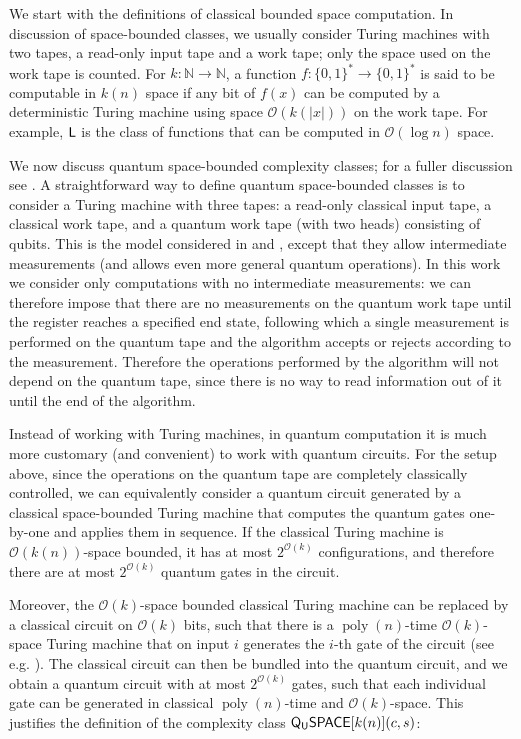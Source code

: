 \documentclass[11pt]{article}
\theoremstyle{definition}
\theoremstyle{remark}
\newcommand\QSPACE{{\sf{Q_{U}SPACE}}}
\newcommand\Logspace{{\sf{L}}}
\newcommand\bigoh{\mathcal{O}}
\DeclareMathOperator{\poly}{poly}
\begin{document}
We start with the definitions of classical bounded space computation. In discussion of space-bounded classes, we usually consider Turing machines with two tapes, a read-only input tape and a work tape; only the space used on the work tape is counted. For $k:\mathbb{N}\rightarrow\mathbb{N}$, a function $f:\{0,1\}^{*}\rightarrow\{0,1\}^*$ is said to be computable in $k(n)$ space if any bit of $f(x)$ can be computed by a deterministic Turing machine using space $\bigoh(k(|x|))$ on the work tape.  For example, $\Logspace$ is the class of functions that can be computed in $\bigoh(\log{n})$ space.

We now discuss quantum space-bounded complexity classes; for a fuller discussion see \cite{Watrous09}. A straightforward way to define quantum space-bounded classes is to consider a Turing machine with three tapes: a read-only classical input tape, a classical work tape, and a quantum work tape (with two heads) consisting of qubits. This is the model considered in \cite{tashma} and \cite{Watrous03}, except that they allow intermediate measurements (and \cite{Watrous03} allows even more general quantum operations). In this work we consider only computations with no intermediate measurements: we can therefore impose that there are no measurements on the quantum work tape until the register reaches a specified end state, following which a single measurement is performed on the quantum tape and the algorithm accepts or rejects according to the measurement. Therefore the operations performed by the algorithm will not depend on the quantum tape, since there is no way to read information out of it until the end of the algorithm.

Instead of working with Turing machines, in quantum computation it is much more customary (and convenient) to work with quantum circuits. For the setup above, since the operations on the quantum tape are completely classically controlled, we can equivalently consider a quantum circuit generated by a classical space-bounded Turing machine that computes the quantum gates one-by-one and applies them in sequence. If the classical Turing machine is $\mathcal{O}(k(n))$-space bounded, it has at most $2^{\mathcal{O}(k)}$ configurations, and therefore there are at most $2^{\mathcal{O}(k)}$ quantum gates in the circuit. 

Moreover, the $\mathcal{O}(k)$-space bounded classical Turing machine can be replaced by a classical circuit on $\mathcal{O}(k)$ bits, such that there is a $\poly(n)$-time $\mathcal{O}(k)$-space Turing machine that on input $i$ generates the $i$-th gate of the circuit (see e.g. \cite[Section~6.8]{ab09}). The classical circuit can then be bundled into the quantum circuit, and we obtain a quantum circuit with at most $2^{\mathcal{O}(k)}$ gates, such that each individual gate can be generated in classical $\poly(n)$-time and $\mathcal{O}(k)$-space. This justifies the definition of the complexity class $\QSPACE[k(n)](c,s)$:
\end{document}

